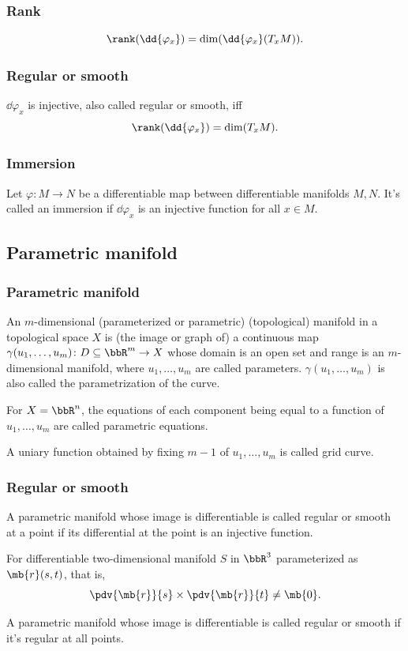 \documentclass[a4paper,12pt]{report}
\begin{document}
\begin{itemize}
\begin{itemize}
\subsubsection{Rank}
\[\rank(\dd{\varphi_x})=\dim(\dd{\varphi_x}(T_xM)).\]
\subsubsection{Regular or smooth}
$\dd{\varphi_x}$ is injective, also called regular or smooth, iff
\[\rank(\dd{\varphi_x})=\dim(T_xM).\]
\subsubsection{Immersion}
Let $\varphi\colon M\to N$ be a differentiable map between differentiable manifolds $M,N$. It's called an immersion if $\dd{\varphi_x}$ is an injective function for all $x\in M$.
\subsection{Parametric manifold}
\subsubsection{Parametric manifold}
An $m$-dimensional (parameterized or parametric) (topological) manifold in a topological space $X$ is (the image or graph of) a continuous map $\gamma(u_1,\ldots,u_m)\colon D\subseteq\bbR^m\to X$ whose domain is an open set and range is an $m$-dimensional manifold, where $u_1,\ldots,u_m$ are called parameters. $\gamma(u_1,\ldots,u_m)$ is also called the parametrization of the curve.

For $X=\bbR^n$, the equations of each component being equal to a function of $u_1,\ldots,u_m$ are called parametric equations.

A uniary function obtained by fixing $m-1$ of $u_1,\ldots,u_m$ is called grid curve.
\subsubsection{Regular or smooth}
A parametric manifold whose image is differentiable is called regular or smooth at a point if its differential at the point is an injective function.

For differentiable two-dimensional manifold $S$ in $\bbR^3$ parameterized as $\mb{r}(s,t)$, that is,
\[\pdv{\mb{r}}{s}\times\pdv{\mb{r}}{t}\ne\mb{0}.\]

A parametric manifold whose image is differentiable is called regular or smooth if it's regular at all points.

\end{itemize}
\end{itemize}
\end{document}
